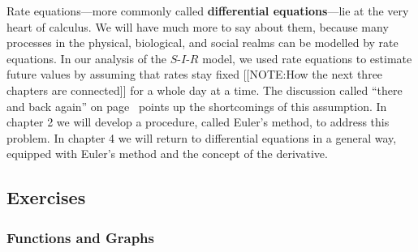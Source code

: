 Rate equations---more commonly called {\bf
  differential equations}---lie at the very heart of
calculus. We will have much more to say
about them, because many processes in the physical, biological, and
social realms can be modelled by rate equations.  In our analysis of
the $S$-$I$-$R$ model, we used rate equations to estimate future
values by assuming that rates stay fixed 
[[NOTE:How the next three chapters are connected]] 
for a whole day at a time.  The discussion called ``there and back
again'' on page~\pageref{`thereback'} points up the shortcomings of
this assumption.  In chapter 2 we will develop a procedure, called
Euler's method, to address this problem.  In chapter 4 we will return
to differential equations in a general way, equipped with Euler's
method and the concept of the derivative.

\subsection{Exercises}
\label{subsec:exercises}

\subsubsection{Functions and Graphs}
\label{subsubsec:functions-and-graphs}




